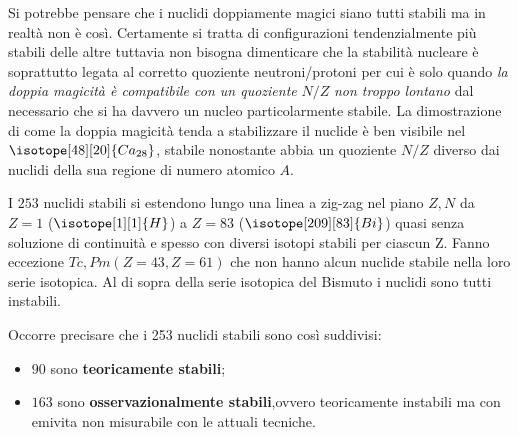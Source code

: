Si potrebbe pensare che i nuclidi doppiamente magici siano tutti stabili
ma in realtà non è così.
Certamente si tratta di configurazioni tendenzialmente più stabili delle altre tuttavia non bisogna dimenticare che
la stabilità nucleare è soprattutto legata al corretto quoziente
neutroni/protoni per cui è solo quando \emph{la doppia magicità è compatibile con
un quoziente} $N/Z$ \emph{non troppo lontano} dal necessario che si ha davvero un
nucleo particolarmente stabile.
La dimostrazione di come la doppia magicità tenda a stabilizzare il nuclide è ben visibile nel
$ \isotope[48][20]{\mathlarger{Ca}_{28}} $, stabile nonostante abbia un quoziente $N/Z$ diverso
dai nuclidi della sua regione di numero atomico $A$.

I $253$ nuclidi stabili si estendono lungo una linea a zig-zag nel piano $Z,N$ da $Z=1$ ($ \isotope[1][1]{\mathlarger{H}} $) 
a $Z=83$ ($ \isotope[209][83]{\mathlarger{Bi}} $) quasi senza soluzione di continuità e spesso con
diversi isotopi stabili per ciascun Z. Fanno eccezione $ Tc,Pm(Z=43,Z=61) $ che non hanno alcun nuclide stabile nella
loro serie isotopica.
Al di sopra della serie isotopica del Bismuto i nuclidi sono tutti instabili.

Occorre precisare che i 253 nuclidi stabili sono così suddivisi:
\begin{itemize}
    \item $ 90 $ sono \textbf{teoricamente stabili};
    \item $ 163 $ sono \textbf{osservazionalmente stabili},ovvero teoricamente instabili ma con emivita non misurabile
    con le attuali tecniche.
\end{itemize}

